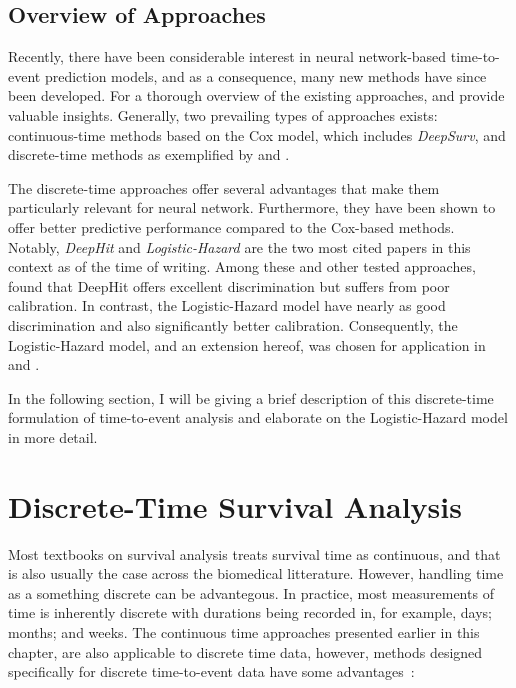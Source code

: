 \subsection{Overview of Approaches}

Recently, there have been considerable interest in neural network-based
time-to-event prediction models, and as a consequence, many new methods 
have since been developed.
For a thorough overview of the existing approaches, 
\textcite{wiegrebeDeep2023} and 
\textcite{kvammeContinuous2021} provide valuable insights.
Generally, two prevailing types of approaches exists:
continuous-time methods based on the Cox model, 
which includes \emph{DeepSurv},
and discrete-time methods as exemplified by 
\textcite{leeDeepHit2018} and \textcite{gensheimerScalable2019}.

The discrete-time approaches offer several advantages that 
make them particularly relevant for neural network. 
Furthermore, they have been shown to offer better predictive
performance compared to the Cox-based methods.
~\autocite{kvammeContinuous2021, leeDeepHit2018, gensheimerScalable2019}
Notably, \emph{DeepHit}\autocite{leeDeepHit2018}
and \emph{Logistic-Hazard}\autocite{gensheimerScalable2019}
are the two most cited papers in this context as of the time of writing.
Among these and other tested approaches,
\textcite{kvammeContinuous2021} found that 
DeepHit offers excellent discrimination but suffers from poor calibration.
In contrast, the Logistic-Hazard model have nearly as good discrimination
and also significantly better calibration. 
Consequently, the Logistic-Hazard model, and an extension hereof, 
was chosen for application in 
\studyii{} and \studyiii{}.

In the following section, I will be giving a brief description of
this discrete-time formulation of time-to-event analysis and 
elaborate on the Logistic-Hazard model in more detail.

\section{Discrete-Time Survival Analysis}

Most textbooks on survival analysis treats survival time as continuous, 
and that is also usually the case across the biomedical litterature.
However, handling time as a something discrete can be advantegous.
In practice, most measurements of time is inherently discrete 
with durations being recorded in, for example, days; months; and weeks.
The continuous time approaches presented earlier in this chapter, 
are also applicable to discrete time data,
however, methods designed specifically for discrete time-to-event 
data have some advantages~\autocite{tutzModeling2016}:

